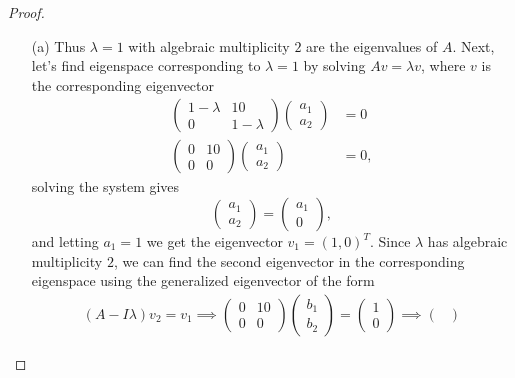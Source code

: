 \documentclass[12pt]{report}
\begin{document}
\begin{problem}
\begin{proof}
\begin{enumerate}
    \item [(a)]
    Thus $\lambda = 1$ with algebraic multiplicity $2$ are the eigenvalues of $A$. Next, let's find eigenspace corresponding to $\lambda = 1$ by solving $Av = \lambda v$, where $v$ is the corresponding eigenvector
    \begin{align*}
        \begin{pmatrix}
            1 - \lambda & 10\\
            0 & 1 - \lambda
        \end{pmatrix}\begin{pmatrix}
            a_1 \\ a_2
        \end{pmatrix} &= 0\\
        \begin{pmatrix}
            0 & 10\\
            0 & 0
        \end{pmatrix}\begin{pmatrix}
            a_1 \\ a_2 
        \end{pmatrix}   &= 0,      
    \end{align*}
    solving the system gives
    \[
        \begin{pmatrix}
            a_1 \\ a_2
        \end{pmatrix} = \begin{pmatrix}
            a_1 \\ 0
        \end{pmatrix},
    \]
    and letting $a_1 = 1$ we get the eigenvector $v_1 = (1, 0)^T$. Since $\lambda$ has algebraic multiplicity $2$, we can find the second eigenvector in the corresponding eigenspace using the generalized eigenvector of the form
    \begin{align*}
        (A - I\lambda)v_2 = v_1 \implies \begin{pmatrix}
            0 & 10\\
            0 & 0
        \end{pmatrix} \begin{pmatrix}
            b_1 \\ b_2
        \end{pmatrix} = \begin{pmatrix}
            1 \\ 0
        \end{pmatrix} \implies \begin{pmatrix}

\end{pmatrix}
\end{align*}
\end{enumerate}
\end{proof}
\end{problem}
\end{document}
